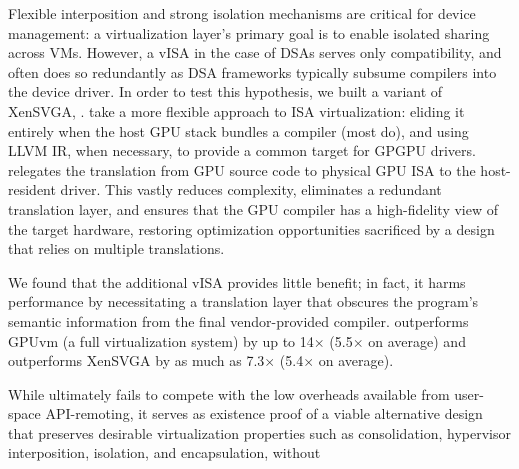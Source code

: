 Flexible interposition and strong isolation mechanisms are critical for device
management: a virtualization layer's primary goal is to enable isolated
sharing across VMs. However, a vISA in the case of DSAs serves only
compatibility, and often does so redundantly as DSA frameworks typically
subsume compilers into the device driver.
In order to test this hypothesis, we built a variant of XenSVGA, \Trillium.
\Trillium take a more flexible approach to ISA virtualization: eliding it
entirely when the host GPU stack bundles a compiler (most do), and using LLVM
IR, when necessary, to provide a common target for GPGPU drivers. \Trillium
relegates the translation from GPU source code to physical GPU ISA to the
host-resident driver. This vastly reduces complexity, eliminates a redundant
translation layer, and ensures that the GPU compiler has a high-fidelity view
of the target hardware, restoring optimization opportunities sacrificed by a
design that relies on multiple translations.

We found that the additional vISA provides little benefit; in fact, it harms
performance by necessitating a translation layer that obscures the program's
semantic information from the final vendor-provided compiler. \Trillium
outperforms GPUvm (a full virtualization system) by up to 14$\times$
(5.5$\times$ on average) and outperforms XenSVGA by as much as 7.3$\times$
(5.4$\times$ on average).

While \Trillium ultimately fails to compete with the low overheads available
from user-space API-remoting, it serves as existence proof of a viable
alternative design that preserves desirable virtualization properties such as
consolidation, hypervisor interposition, isolation, and encapsulation, without
